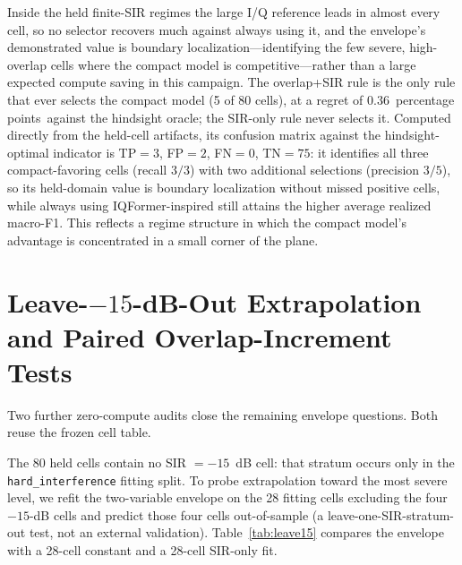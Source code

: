 \documentclass[letterpaper,onecolumn,11pt,journal]{IEEEtran}
\newcommand{\pp}{percentage points}
\begin{document}
Inside the held finite-SIR regimes the
large I/Q reference leads in almost every cell, so no selector recovers much
against always using it, and the envelope's demonstrated value is boundary
localization---identifying the few severe, high-overlap cells where the
compact model is competitive---rather than a large expected compute saving in
this campaign. The overlap+SIR rule is the only rule that ever selects the
compact model (5 of 80 cells), at a regret of $0.36$~\pp\ against the
hindsight oracle; the SIR-only rule never selects it. Computed directly from
the held-cell artifacts, its confusion matrix against the hindsight-optimal
indicator is TP$=3$, FP$=2$, FN$=0$, TN$=75$: it identifies all three
compact-favoring cells (recall $3/3$) with two additional selections
(precision $3/5$), so its held-domain value is boundary localization without
missed positive cells, while always using IQFormer-inspired still attains the
higher average realized macro-F1. This reflects a regime structure in which the
compact model's advantage is concentrated in a small corner of the plane.

\section{Leave-\texorpdfstring{$-15$}{-15}-dB-Out Extrapolation and Paired Overlap-Increment Tests}
\label{sec:s4tests}
Two further zero-compute audits close the remaining envelope questions. Both
reuse the frozen cell table.

The 80 held cells contain no SIR $=-15$~dB cell: that stratum occurs only in
the \texttt{hard\_interference} fitting split. To probe extrapolation toward
the most severe level, we refit the two-variable envelope on the 28 fitting
cells excluding the four $-15$-dB cells and predict those four cells
out-of-sample (a leave-one-SIR-stratum-out test, not an external validation).
Table~\ref{tab:leave15} compares the envelope with a 28-cell constant and a
28-cell SIR-only fit.
\end{document}
